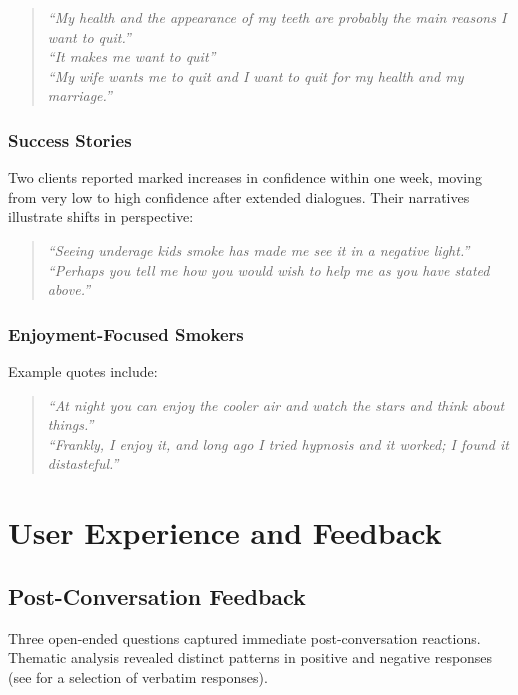 \begin{quote}
\emph{``My health and the appearance of my teeth are probably the main reasons I want to quit.''} \\
\emph{``It makes me want to quit''} \\
\emph{``My wife wants me to quit and I want to quit for my health and my marriage.''}
\end{quote}

\subsubsection{Success Stories}

Two clients reported marked increases in confidence within one week, moving from very low to high confidence after extended dialogues. Their narratives illustrate shifts in perspective:

\begin{quote}
\emph{``Seeing underage kids smoke has made me see it in a negative light.''} \\
\emph{``Perhaps you tell me how you would wish to help me as you have stated above.''}
\end{quote}

\subsubsection{Enjoyment-Focused Smokers}

Example quotes include:
    \begin{quote}
    \emph{``At night you can enjoy the cooler air and watch the stars and think about things.''} \\
    \emph{``Frankly, I enjoy it, and long ago I tried hypnosis and it worked; I found it distasteful.''}
    \end{quote}



\section{User Experience and Feedback}
\label{sec:feedback}

\subsection*{Post-Conversation Feedback}

Three open-ended questions captured immediate post-conversation reactions. Thematic analysis revealed distinct patterns in positive and negative responses (see  for a selection of verbatim responses).

